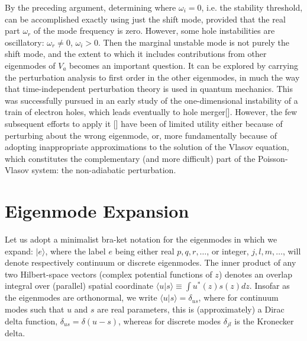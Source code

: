 \documentclass[12pt]{article}
\def\ket#1{|#1\rangle}
\def\bra#1{\langle#1}
\begin{document}
By the preceding argument, determining where $\omega_i=0$, i.e. the
stability threshold, can be accomplished exactly using just the shift
mode, provided that the real part $\omega_r$ of the mode frequency is
zero. However, some hole instabilities are oscillatory:
$\omega_r\not=0$, $\omega_i>0$. Then the marginal unstable mode is not
purely the shift mode, and the extent to which it includes
contributions from other eigenmodes of $V_a$ becomes an important
question. It can be explored by carrying the perturbation analysis to
first order in the other eigenmodes, in much the way that
time-independent perturbation theory is used in quantum
mechanics. This was successfully pursued in an early study of the
one-dimensional instability of a train of electron holes, which leads
eventually to hole merger[]. However, the few subsequent efforts to
apply it [] have been of limited utility either because of perturbing
about the wrong eigenmode, or, more fundamentally because of adopting
inappropriate approximations to the solution of the Vlasov equation,
which constitutes the complementary (and more difficult) part of the
Poisson-Vlasov system: the non-adiabatic perturbation.


\section{Eigenmode Expansion}
Let us adopt a minimalist bra-ket notation for the eigenmodes in which
we expand: $\ket{e}$, where the label $e$ being either real
$p,q,r,\dots$, or integer, $j,l,m,\dots$, will denote respectively
continuum or discrete eigenmodes. The inner product of any two
Hilbert-space vectors (complex potential functions of $z$) denotes an
overlap integral over (parallel) spatial coordinate
$\bra{u}\ket{s}\equiv \int u^*(z)s(z)dz$. Insofar as the eigenmodes
are orthonormal, we write $\bra{u}\ket{s}=\delta_{us}$, where for
continuum modes such that $u$ and $s$ are real parameters, this is
(approximately) a Dirac delta function, $\delta_{us}=\delta(u-s)$,
whereas for discrete modes $\delta_{jl}$ is the Kronecker delta.
\end{document}
